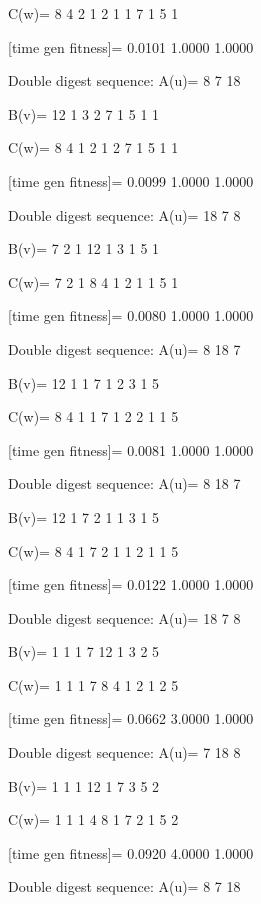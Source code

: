 C(w)=
     8     4     2     1     2     1     1     7     1     5     1

[time gen fitness]=
    0.0101    1.0000    1.0000

Double digest sequence:
A(u)=
     8     7    18

B(v)=
    12     1     3     2     7     1     5     1     1

C(w)=
     8     4     1     2     1     2     7     1     5     1     1

[time gen fitness]=
    0.0099    1.0000    1.0000

Double digest sequence:
A(u)=
    18     7     8

B(v)=
     7     2     1    12     1     3     1     5     1

C(w)=
     7     2     1     8     4     1     2     1     1     5     1

[time gen fitness]=
    0.0080    1.0000    1.0000

Double digest sequence:
A(u)=
     8    18     7

B(v)=
    12     1     1     7     1     2     3     1     5

C(w)=
     8     4     1     1     7     1     2     2     1     1     5

[time gen fitness]=
    0.0081    1.0000    1.0000

Double digest sequence:
A(u)=
     8    18     7

B(v)=
    12     1     7     2     1     1     3     1     5

C(w)=
     8     4     1     7     2     1     1     2     1     1     5

[time gen fitness]=
    0.0122    1.0000    1.0000

Double digest sequence:
A(u)=
    18     7     8

B(v)=
     1     1     1     7    12     1     3     2     5

C(w)=
     1     1     1     7     8     4     1     2     1     2     5

[time gen fitness]=
    0.0662    3.0000    1.0000

Double digest sequence:
A(u)=
     7    18     8

B(v)=
     1     1     1    12     1     7     3     5     2

C(w)=
     1     1     1     4     8     1     7     2     1     5     2

[time gen fitness]=
    0.0920    4.0000    1.0000

Double digest sequence:
A(u)=
     8     7    18

